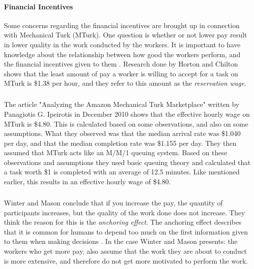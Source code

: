 \paragraph{Financial Incentives} 
Some concerns regarding the financial incentives are brought up in connection with Mechanical Turk (MTurk). One question is whether or not lower pay result in lower quality in the work conducted by the workers. It is important to have knowledge about the relationship between how good the workers perform, and the financial incentives given to them \cite{incentivesAmt}. Research done by Horton and Chilton \cite{amtpay} shows that the least amount of pay a worker is willing to accept for a task on MTurk is \$1.38 per hour, and they refer to this amount as the \emph{reservation wage}. 
\subparagraph{}
The article "Analyzing the Amazon Mechanical Turk Marketplace" \cite{averagepay} written by Panagiotis G. Ipeirotis in December 2010 shows that the effective hourly wage on MTurk is \$4.80. This is calculated based on some observations, and also on some assumptions. What they observed was that the median arrival rate was \$1.040 per day, and that the median completion rate was \$1.155 per day. They then assumed that MTurk acts like an M/M/1 queuing system. Based on these observations and assumptions they used basic queuing theory and calculated that a task worth \$1 is completed with an average of 12.5 minutes. Like mentioned earlier, this results in an effective hourly wage of \$4.80.
\subparagraph{}
Winter and Mason \cite{incentivesAmt} conclude that if you increase the pay, the quantity of participants increases, but the quality of the work done does not increase. They think the reason for this is the \emph{anchoring effect}. The anchoring effect describes that it is common for humans to depend too much on the first information given to them when making decisions \cite{anchoring}. In the case Winter and Mason presents: the workers who get more pay, also assume that the work they are about to conduct is more extensive, and therefore do not get more motivated to perform the work. 

